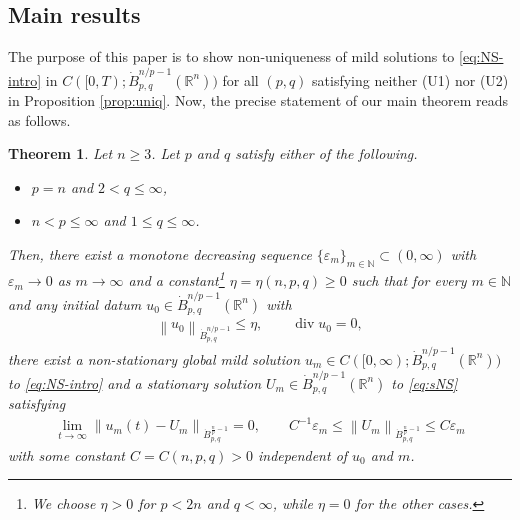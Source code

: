 \documentclass[a4paper,12pt,reqno]{amsart}
\theoremstyle{plain}
\newtheorem{thm}{Theorem}[section]
\theoremstyle{definition}
\renewcommand{\div}{\operatorname{div}}
\newcommand{\dB}{\dot{B}}
\renewcommand{\leq}{\leqslant}
\renewcommand{\geq}{\geqslant}
\newcommand{\n}[1]{{\left\|#1\right\|}}
\newcommand{\R}{\mathbb{R}}
\newcommand{\N}{\mathbb{N}}
\begin{document}
\subsection{Main results}
The purpose of this paper is to show non-uniqueness of mild solutions to \eqref{eq:NS-intro} in $C([0,T);\dB_{p,q}^{n/p-1}(\R^n))$ for all $(p,q)$ satisfying neither (U1) nor (U2) in Proposition \ref{prop:uniq}.
Now, the precise statement of our main theorem reads as follows.
\begin{thm}\label{thm:main}
    Let $n \geq 3$.
    Let $p$ and $q$ satisfy either of the following.
    \begin{itemize}
        \item [\rm (N1)] $p=n$ and $2<q \leq \infty$,
        \item [\rm (N2)] $n < p \leq \infty$ and $1 \leq q \leq \infty$.
    \end{itemize}
    Then, there exist a monotone decreasing sequence $\{\varepsilon_m\}_{m \in \N} \subset (0,\infty)$ with $\varepsilon_m \to 0$ as $m \to \infty$ and a constant\footnote{We choose $\eta>0$ for $p<2n$ and $q<\infty$, while $\eta=0$ for the other cases.} $\eta=\eta(n,p,q)\geq 0$ such that for every $m \in \N$ and any initial datum $u_0 \in \dB_{p,q}^{n/p-1}(\R^n)$ with 
    \begin{align}
        \n{u_0}_{\dB_{p,q}^{n/p-1}} \leq \eta, \qquad \div u_0=0,
    \end{align}
    there exist a non-stationary global mild solution
    $u_m \in C([0,\infty);\dot{B}_{p,q}^{n/p-1}(\mathbb{R}^n))$
    to \eqref{eq:NS-intro} and a stationary solution $U_m \in \dB_{p,q}^{n/p-1}(\mathbb{R}^n)$ to \eqref{eq:sNS} satisfying
    \begin{align}
        \lim_{t \to \infty} \n{ u_m(t) - U_m}_{\dB_{p,q}^{\frac{n}{p}-1}} = 0,
        \qquad
        C^{-1}\varepsilon_m \leq \n{U_m}_{\dB_{p,q}^{\frac{n}{p}-1}}\leq C\varepsilon_m
    \end{align}
    with some constant $C=C(n,p,q)>0$ independent of $u_0$ and $m$.
\end{thm}
\end{document}
